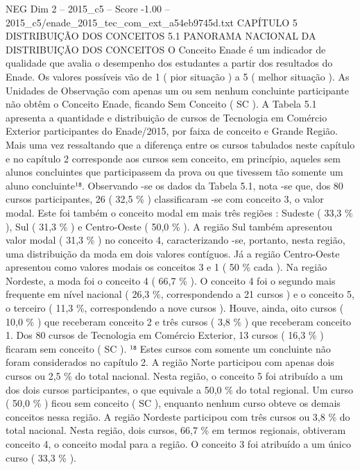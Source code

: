 \begin{textsample}{NEG Dim 2 – 2015\_c5 – Score -1.00 – 2015\_c5/enade\_2015\_tec\_com\_ext\_a54eb9745d.txt}  \label{ex:f2_neg_157}
CAPÍTULO 5 DISTRIBUIÇÃO DOS CONCEITOS 5.1 PANORAMA NACIONAL DA DISTRIBUIÇÃO DOS CONCEITOS O Conceito Enade é um indicador de qualidade que avalia o desempenho dos estudantes a partir dos resultados do Enade.
Os valores possíveis vão de 1 ( pior situação ) a 5 ( melhor situação ).
As Unidades de Observação com apenas um ou sem nenhum concluinte participante não obtêm o Conceito Enade, ficando Sem Conceito ( SC ).
A Tabela 5.1 apresenta a quantidade e distribuição de cursos de Tecnologia em Comércio Exterior participantes do Enade/2015, por faixa de conceito e Grande Região.
Mais uma vez ressaltando que a diferença entre os cursos tabulados neste capítulo e no capítulo 2 corresponde aos cursos sem conceito, em princípio, aqueles sem alunos concluintes que participassem da prova ou que tivessem tão somente um aluno concluinte¹⁸.
Observando -se os dados da Tabela 5.1, nota -se que, dos 80 cursos participantes, 26 ( 32,5 \% ) classificaram -se com conceito 3, o valor modal.
Este foi também o conceito modal em mais três regiões : Sudeste ( 33,3 \% ), Sul ( 31,3 \% ) e Centro-Oeste ( 50,0 \% ).
A região Sul também apresentou valor modal ( 31,3 \% ) no conceito 4, caracterizando -se, portanto, nesta região, uma distribuição da moda em dois valores contíguos.
Já a região Centro-Oeste apresentou como valores modais os conceitos 3 e 1 ( 50 \% cada ).
Na região Nordeste, a moda foi o conceito 4 ( 66,7 \% ).
O conceito 4 foi o segundo mais frequente em nível nacional ( 26,3 \%, correspondendo a 21 cursos ) e o conceito 5, o terceiro ( 11,3 \%, correspondendo a nove cursos ).
Houve, ainda, oito cursos ( 10,0 \% ) que receberam conceito 2 e três cursos ( 3,8 \% ) que receberam conceito 1.
Dos 80 cursos de Tecnologia em Comércio Exterior, 13 cursos ( 16,3 \% ) ficaram sem conceito ( SC ). ¹⁸ Estes cursos com somente um concluinte não foram considerados no capítulo 2.
A região Norte participou com apenas dois cursos ou 2,5 \% do total nacional.
Nesta região, o conceito 5 foi atribuído a um dos dois cursos participantes, o que equivale a 50,0 \% do total regional.
Um curso ( 50,0 \% ) ficou sem conceito ( SC ), enquanto nenhum curso obteve os demais conceitos nessa região.
A região Nordeste participou com três cursos ou 3,8 \% do total nacional.
Nesta região, dois cursos, 66,7 \% em termos regionais, obtiveram conceito 4, o conceito modal para a região.
O conceito 3 foi atribuído a um único curso ( 33,3 \% ).

\end{textsample}
